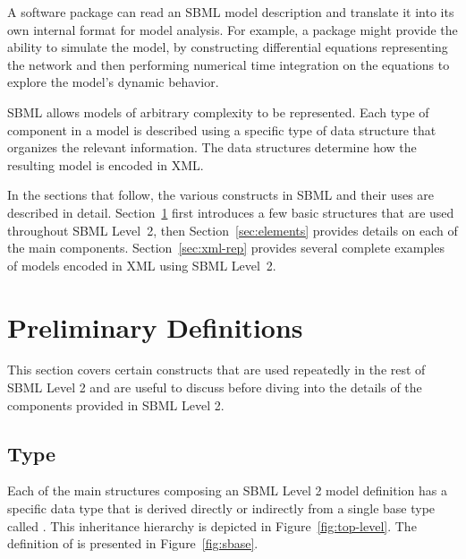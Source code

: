 \documentclass[10pt,twocolumntoc]{cekarticle}
\newcommand{\vref}[1]{\ref{#1}}
\begin{document}
A software package can read an SBML model description and translate it
into its own internal format for model analysis.  For example, a package
might provide the ability to simulate the model, by constructing
differential equations representing the network and then performing
numerical time integration on the equations to explore the model's dynamic
behavior.

SBML allows models of arbitrary complexity to be represented.  Each type of
component in a model is described using a specific type of data structure
that organizes the relevant information.  The data structures determine how
the resulting model is encoded in XML.

In the sections that follow, the various constructs in SBML and their uses
are described in detail.  Section~\ref{sec:general} first introduces a few
basic structures that are used throughout SBML Level~2, then
Section~\ref{sec:elements} provides details on each of the main components.
Section~\ref{sec:xml-rep} provides several complete examples of models
encoded in XML using SBML Level~2.


\section{Preliminary Definitions}
\label{sec:general}

This section covers certain constructs that are used repeatedly in
the rest of SBML Level 2 and are useful to discuss before diving
into the details of the components provided in SBML Level 2.

\subsection{Type }
\label{sec:sbase}

Each of the main structures composing an SBML Level 2 model definition has
a specific data type that is derived directly or indirectly from a single
base type called .  This inheritance hierarchy is depicted in
Figure~\vref{fig:top-level}.  The definition of  is presented
in Figure~\vref{fig:sbase}.
\end{document}
